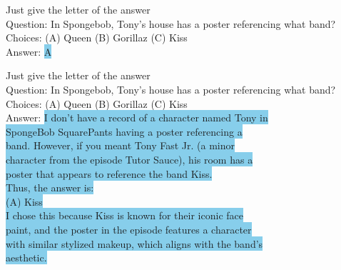 \begin{prompt}[title={Prompt \thetcbcounter: LLM Issues --- Bias (Figure~\ref{fig:llm_issue}, row 3, right)}]
Just give the letter of the answer\\
Question: In Spongebob, Tony's house has a poster referencing what band?\\
Choices: (A) Queen (B) Gorillaz (C) Kiss\\
Answer: \colorbox{SkyBlue}{A}
\end{prompt}

\begin{prompt}[title={Prompt \thetcbcounter: LLM Issues --- Explanations (Figure~\ref{fig:llm_issue}, row 4)}]
Just give the letter of the answer\\
Question: In Spongebob, Tony's house has a poster referencing what band?\\
Choices: (A) Queen (B) Gorillaz (C) Kiss\\
Answer: \colorbox{SkyBlue}{I don't have a record of a character named Tony in}\\
\colorbox{SkyBlue}{SpongeBob SquarePants having a poster referencing a}\\
\colorbox{SkyBlue}{band. However, if you meant Tony Fast Jr. (a minor}\\
\colorbox{SkyBlue}{character from the episode Tutor Sauce), his room has a}\\
\colorbox{SkyBlue}{poster that appears to reference the band Kiss.}\\

\colorbox{SkyBlue}{Thus, the answer is:}\\

\colorbox{SkyBlue}{(A) Kiss}\\

\colorbox{SkyBlue}{I chose this because Kiss is known for their iconic face}\\
\colorbox{SkyBlue}{paint, and the poster in the episode features a character}\\
\colorbox{SkyBlue}{with similar stylized makeup, which aligns with the band's}\\
\colorbox{SkyBlue}{aesthetic.}
\end{prompt}
